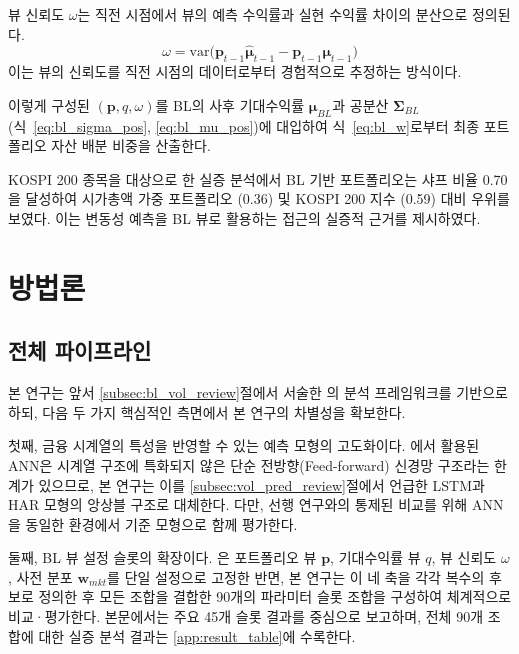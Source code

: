 \documentclass{article}
\begin{document}
뷰 신뢰도 $\omega$는 직전 시점에서 뷰의 예측 수익률과 실현 수익률 차이의 분산으로 정의된다.
\begin{equation}
\omega = \mathrm{var}\bigl(\mathbf{p}_{t-1} \hat{\boldsymbol{\mu}}_{t-1}
       - \mathbf{p}_{t-1} \boldsymbol{\mu}_{t-1}\bigr)
\label{eq:pyo_omega}
\end{equation}
이는 뷰의 신뢰도를 직전 시점의 데이터로부터 경험적으로 추정하는 방식이다.

이렇게 구성된 $(\mathbf{p}, q, \omega)$를 BL의 사후 기대수익률 $\boldsymbol{\mu}_{BL}$과 공분산 $\boldsymbol{\Sigma}_{BL}$ (식~\eqref{eq:bl_sigma_pos}, \eqref{eq:bl_mu_pos})에 대입하여 식~\eqref{eq:bl_w}로부터 최종 포트폴리오 자산 배분 비중을 산출한다.

KOSPI 200 종목을 대상으로 한 실증 분석에서 BL 기반 포트폴리오는 샤프 비율 0.70을 달성하여 시가총액 가중 포트폴리오 (0.36) 및 KOSPI 200 지수 (0.59) 대비 우위를 보였다. 이는 변동성 예측을 BL 뷰로 활용하는 접근의 실증적 근거를 제시하였다.

\section{방법론}\label{sec:method}

\subsection{전체 파이프라인}\label{subsec:pipeline}

본 연구는 앞서 \ref{subsec:bl_vol_review}절에서 서술한 \citet{pyo2018}의 분석 프레임워크를 기반으로 하되, 다음 두 가지 핵심적인 측면에서 본 연구의 차별성을 확보한다.

첫째, 금융 시계열의 특성을 반영할 수 있는 예측 모형의 고도화이다. \citet{pyo2018}에서 활용된 ANN은 시계열 구조에 특화되지 않은 단순 전방향(Feed-forward) 신경망 구조라는 한계가 있으므로, 본 연구는 이를 \ref{subsec:vol_pred_review}절에서 언급한 LSTM과 HAR 모형의 앙상블 구조로 대체한다. 다만, 선행 연구와의 통제된 비교를 위해 ANN을 동일한 환경에서 기준 모형으로 함께 평가한다.

둘째, BL 뷰 설정 슬롯의 확장이다. \citet{pyo2018}은 포트폴리오 뷰 $\mathbf{p}$, 기대수익률 뷰 $q$, 뷰 신뢰도 $\omega$, 사전 분포 $\mathbf{w}_{mkt}$를 단일 설정으로 고정한 반면, 본 연구는 이 네 축을 각각 복수의 후보로 정의한 후 모든 조합을 결합한 90개의 파라미터 슬롯 조합을 구성하여 체계적으로 비교·평가한다. 본문에서는 주요 45개 슬롯 결과를 중심으로 보고하며, 전체 90개 조합에 대한 실증 분석 결과는 \ref{app:result_table}에 수록한다.
\end{document}
